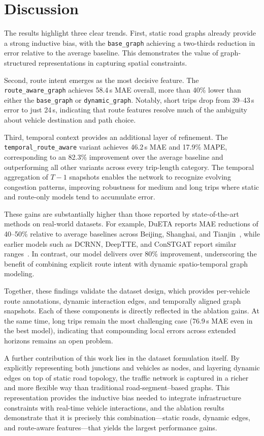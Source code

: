 \section{Discussion}

The results highlight three clear trends. First, static road graphs already provide a strong inductive bias, with the \texttt{base\_graph} achieving a two-thirds reduction in error relative to the average baseline. This demonstrates the value of graph-structured representations in capturing spatial constraints.

Second, route intent emerges as the most decisive feature. The \texttt{route\_aware\_graph} achieves 58.4\,s MAE overall, more than 40\% lower than either the \texttt{base\_graph} or \texttt{dynamic\_graph}. Notably, short trips drop from 39--43\,s error to just 24\,s, indicating that route features resolve much of the ambiguity about vehicle destination and path choice.

Third, temporal context provides an additional layer of refinement. The \texttt{temporal\_route\_aware} variant achieves 46.2\,s MAE and 17.9\% MAPE, corresponding to an 82.3\% improvement over the average baseline and outperforming all other variants across every trip-length category. The temporal aggregation of $T{-}1$ snapshots enables the network to recognize evolving congestion patterns, improving robustness for medium and long trips where static and route-only models tend to accumulate error.

These gains are substantially higher than those reported by state-of-the-art methods on real-world datasets. For example, DuETA reports MAE reductions of 40--50\% relative to average baselines across Beijing, Shanghai, and Tianjin~\cite{dueta2023}, while earlier models such as DCRNN, DeepTTE, and ConSTGAT report similar ranges~\cite{dcrnn2018,deepTTE2018,constgat2020}. In contrast, our model delivers over 80\% improvement, underscoring the benefit of combining explicit route intent with dynamic spatio-temporal graph modeling.

Together, these findings validate the dataset design, which provides per-vehicle route annotations, dynamic interaction edges, and temporally aligned graph snapshots. Each of these components is directly reflected in the ablation gains. At the same time, long trips remain the most challenging case (76.9\,s MAE even in the best model), indicating that compounding local errors across extended horizons remains an open problem.

A further contribution of this work lies in the dataset formulation itself. By explicitly representing both junctions and vehicles as nodes, and layering dynamic edges on top of static road topology, the traffic network is captured in a richer and more flexible way than traditional road-segment–based graphs. This representation provides the inductive bias needed to integrate infrastructure constraints with real-time vehicle interactions, and the ablation results demonstrate that it is precisely this combination—static roads, dynamic edges, and route-aware features—that yields the largest performance gains.


